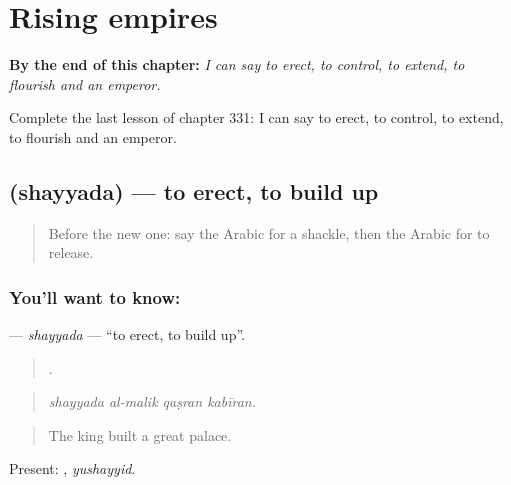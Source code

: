 
\chapter{Rising empires}
\label{ch:ar-rising-empires}

\begin{chapteropening}
\textbf{By the end of this chapter:} \emph{I can say to erect, to control, to extend, to flourish and an emperor.}

Complete the last lesson of chapter 331: I can say to erect, to control, to extend, to flourish and an emperor.
\end{chapteropening}

\section[\texorpdfstring{\ar{شيد} (shayyada)}{شيد (shayyada)}]{ (shayyada) — to erect, to build up}

\label{lesson:AR-C331-shayyada}



\begin{quote}
Before the new one: say the Arabic for a shackle, then the Arabic for to release.
\end{quote}

\subsection*{You'll want to know: }
\textbf{} — \emph{shayyada} — \textquotedblleft{}to erect, to build up\textquotedblright{}.

\begin{quote}
   .
\end{quote}

\begin{quote}
\emph{shayyada al-malik qaṣran kabīran.}
\end{quote}

\begin{quote}
The king built a great palace.
\end{quote}

Present: , \emph{yushayyid}.

